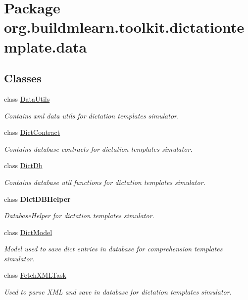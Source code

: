 \hypertarget{namespaceorg_1_1buildmlearn_1_1toolkit_1_1dictationtemplate_1_1data}{}\section{Package org.\+buildmlearn.\+toolkit.\+dictationtemplate.\+data}
\label{namespaceorg_1_1buildmlearn_1_1toolkit_1_1dictationtemplate_1_1data}
\subsection*{Classes}
\begin{DoxyCompactItemize}
\item 
class \hyperlink{classorg_1_1buildmlearn_1_1toolkit_1_1dictationtemplate_1_1data_1_1DataUtils}{Data\+Utils}
\begin{DoxyCompactList}\small\item\em Contains xml data utils for dictation template\textquotesingle{}s simulator. \end{DoxyCompactList}\item 
class \hyperlink{classorg_1_1buildmlearn_1_1toolkit_1_1dictationtemplate_1_1data_1_1DictContract}{Dict\+Contract}
\begin{DoxyCompactList}\small\item\em Contains database contracts for dictation template\textquotesingle{}s simulator. \end{DoxyCompactList}\item 
class \hyperlink{classorg_1_1buildmlearn_1_1toolkit_1_1dictationtemplate_1_1data_1_1DictDb}{Dict\+Db}
\begin{DoxyCompactList}\small\item\em Contains database util functions for dictation template\textquotesingle{}s simulator. \end{DoxyCompactList}\item 
class {\bfseries Dict\+D\+B\+Helper}
\begin{DoxyCompactList}\small\item\em Database\+Helper for dictation template\textquotesingle{}s simulator. \end{DoxyCompactList}\item 
class \hyperlink{classorg_1_1buildmlearn_1_1toolkit_1_1dictationtemplate_1_1data_1_1DictModel}{Dict\+Model}
\begin{DoxyCompactList}\small\item\em Model used to save dict entries in database for comprehension template\textquotesingle{}s simulator. \end{DoxyCompactList}\item 
class \hyperlink{classorg_1_1buildmlearn_1_1toolkit_1_1dictationtemplate_1_1data_1_1FetchXMLTask}{Fetch\+X\+M\+L\+Task}
\begin{DoxyCompactList}\small\item\em Used to parse X\+ML and save in database for dictation template\textquotesingle{}s simulator. \end{DoxyCompactList}\end{DoxyCompactItemize}
